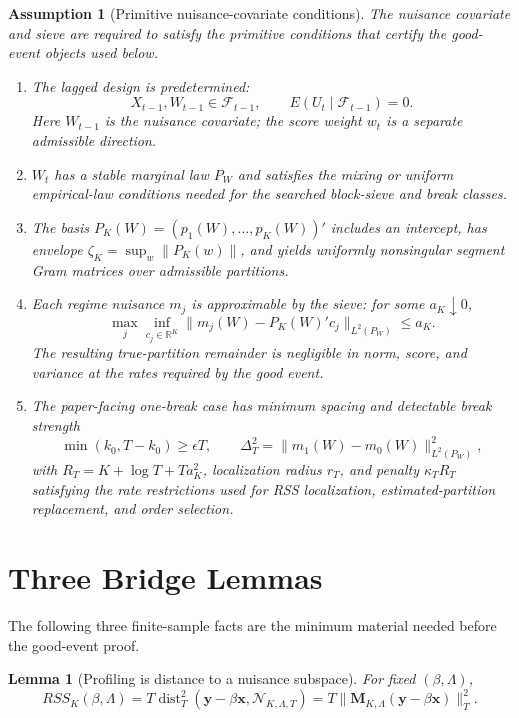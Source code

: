 \documentclass[12pt]{article}
\numberwithin{equation}{section}
\newtheorem{lemma}{Lemma}
\newtheorem{assumption}{Assumption}
\theoremstyle{definition}
\newcommand{\R}{\mathbb R}
\newcommand{\N}{\mathcal N}
\begin{document}
\begin{assumption}[Primitive nuisance-covariate conditions]
\label{ass:min-nuisance-covariate-sieve}
The nuisance covariate and sieve are required to satisfy the primitive
conditions that certify the good-event objects used below.
\begin{enumerate}[leftmargin=2em]
\item The lagged design is predetermined:
\[
    X_{t-1},W_{t-1}\in\mathcal F_{t-1},
    \qquad E(U_t\mid\mathcal F_{t-1})=0.
\]
Here \(W_{t-1}\) is the nuisance covariate; the score weight \(w_t\) is a
separate admissible direction.

\item \(W_t\) has a stable marginal law \(P_W\) and satisfies the mixing or
uniform empirical-law conditions needed for the searched block-sieve and break
classes.

\item The basis \(P_K(W)=(p_1(W),\ldots,p_K(W))'\) includes an intercept, has
envelope \(\zeta_K=\sup_w\|P_K(w)\|\), and yields uniformly nonsingular segment
Gram matrices over admissible partitions.

\item Each regime nuisance \(m_j\) is approximable by the sieve: for some
\(a_K\downarrow0\),
\[
    \max_j\inf_{c_j\in\R^K}
    \|m_j(W)-P_K(W)'c_j\|_{L^2(P_W)}\le a_K.
\]
The resulting true-partition remainder is negligible in norm, score, and
variance at the rates required by the good event.

\item The paper-facing one-break case has minimum spacing and detectable break
strength
\[
    \min(k_0,T-k_0)\ge \epsilon T,
    \qquad
    \Delta_T^2=\|m_1(W)-m_0(W)\|_{L^2(P_W)}^2,
\]
with \(R_T=K+\log T+Ta_K^2\), localization radius \(r_T\), and penalty
\(\kappa_T R_T\) satisfying the rate restrictions used for RSS localization,
estimated-partition replacement, and order selection.
\end{enumerate}
\end{assumption}

\section{Three Bridge Lemmas}

The following three finite-sample facts are the minimum material needed before
the good-event proof.

\begin{lemma}[Profiling is distance to a nuisance subspace]
\label{lem:min-rss-distance}
For fixed \((\beta,\Lambda)\),
\[
    RSS_K(\beta,\Lambda)
    =
    T\operatorname{dist}_T^2(\bm y-\beta\bm x,\N_{K,\Lambda,T})
    =
    T\|\bm M_{K,\Lambda}(\bm y-\beta\bm x)\|_T^2.
\]
\end{lemma}
\end{document}
